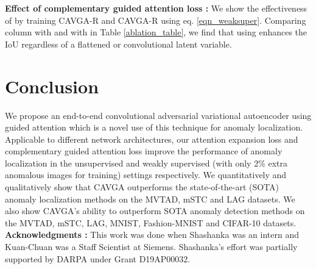 \documentclass[runningheads]{llncs}
\begin{document}
\textbf{Effect of complementary guided attention loss :} We show the effectiveness of  by training CAVGA-R and CAVGA-R using eq. \ref{eqn_weaksuper}. Comparing column  with  and  with  in Table \ref{ablation_table}, we find that using  enhances the IoU regardless of a flattened or convolutional latent variable.


\section{Conclusion}
\label{conclusion}
We propose an end-to-end convolutional adversarial variational autoencoder using guided attention which is a novel use of this technique for anomaly localization. Applicable to different network architectures, our attention expansion loss and complementary guided attention loss improve the performance of anomaly localization in the unsupervised and weakly supervised (with only 2\% extra anomalous images for training) settings respectively. We quantitatively and qualitatively show that CAVGA outperforms the state-of-the-art (SOTA) anomaly localization methods on the MVTAD, mSTC and LAG datasets. We also show CAVGA's ability to outperform SOTA anomaly detection methods on the MVTAD, mSTC, LAG, MNIST, Fashion-MNIST and CIFAR-10 datasets. \\

  
  
\textbf{Acknowledgments :} This work was done when Shashanka was an intern and Kuan-Chuan was a Staff Scientist at Siemens. Shashanka's effort was partially supported by DARPA under Grant D19AP00032.  
\clearpage



\end{document}
